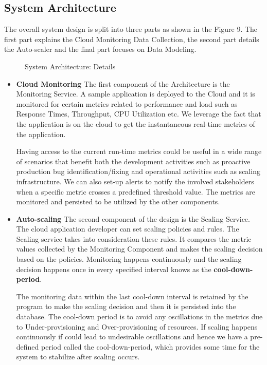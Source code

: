 \documentclass[article,type=msc,colorback,12pt,accentcolor=tud7b,table]{tudthesis}
\begin{document}
 \subsection{System Architecture }
 	The overall system design is split into three parts as shown in the Figure 9. The first part explains the Cloud Monitoring Data Collection, the second part details the Auto-scaler and the final part focuses on Data Modeling. 			
 	
 			 \begin{figure}
 			 	\begin{center}
 			 		\makebox[\textwidth]{\texttt{[image: C2]}}
 			 	\end{center}
 			 	\caption{System Architecture: Details}
 			 \end{figure}
 	
 	 \begin{itemize}
 	 	\item{\textbf{Cloud Monitoring}} 
 	 	\newline   The first component of the Architecture is the Monitoring Service. A sample application is deployed to the Cloud and it is monitored for certain metrics related to performance and load such as Response Times, Throughput, CPU Utilization etc. We leverage the fact that the application is on the cloud to get the instantaneous real-time metrics of the application. 
 	 	\par Having access to the current run-time metrics could be useful in a wide range of scenarios that benefit both the development activities such as proactive production bug identification/fixing and operational activities such as scaling infrastructure. We can also set-up alerts to notify the involved stakeholders when a specific metric crosses a predefined threshold value. The metrics are monitored and persisted to be utilized by the other components. 
 	 	
 	 	\item {\textbf{Auto-scaling}} 
 	 	\newline The second component of the design is the Scaling Service. The cloud application developer can set scaling policies and rules. The Scaling service takes into consideration these rules. It compares the metric values collected by the Monitoring Component and makes the scaling decision based on the policies. Monitoring happens continuously and the scaling decision happens once in every specified interval knows as the \textbf{cool-down-period}. 
 	 	\par The monitoring data within the last cool-down interval is retained by the program to make the scaling decision and then it is persisted into the database. The cool-down period is to avoid any oscillations in the metrics due to Under-provisioning and Over-provisioning of resources. If scaling happens continuously if could lead to undesirable oscillations and hence we have a pre-defined period called the cool-down-period, which provides some time for the system to stabilize after scaling occurs. 
 	 	

\end{itemize}
\end{document}
